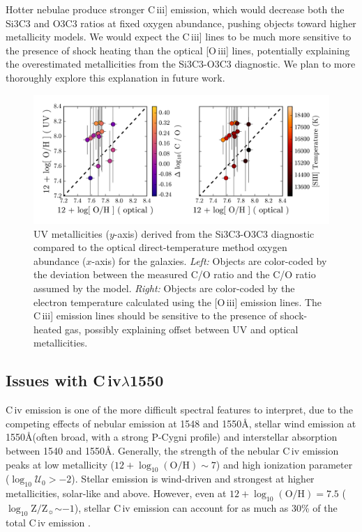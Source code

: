 \documentclass[preprint2]{aastex62}
\newcommand{\oiii}{[O\,{\sc iii}]\xspace}
\newcommand{\civ}{C\,{\sc iv}\xspace}
\newcommand{\ciii}{C\,{\sc iii}]\xspace}
\newcommand{\logten}{\ensuremath{\log_{10}}}
\newcommand{\logZ}{\ensuremath{\logten \mathrm{Z}/\mathrm{Z}_{\sun}}\xspace}
\newcommand{\logOH}{\ensuremath{\logten (\mathrm{O}/\mathrm{H})}\xspace}
\newcommand{\ang}{\ensuremath{\mbox{\AA}}\xspace}
\newcommand{\logU}{\ensuremath{\logten \mathcal{U}_0}}
\begin{document}
Hotter nebulae produce stronger \ciii emission, which would decrease both the Si3C3 and O3C3 ratios at fixed oxygen abundance, pushing objects toward higher metallicity models. We would expect the \ciii lines to be much more sensitive to the presence of shock heating than the optical \oiii lines, potentially explaining the overestimated metallicities from the Si3C3-O3C3 diagnostic. We plan to more thoroughly explore this explanation in future work.

\begin{figure}
  \begin{center}
    \includegraphics[width=\linewidth]{figs/f9.png}
    \caption{UV metallicities ($y$-axis) derived from the Si3C3-O3C3 diagnostic compared to the optical direct-temperature method oxygen abundance ($x$-axis) for the \citet{Berg+2016} galaxies. \emph{Left:} Objects are color-coded by the deviation between the measured C/O ratio and the C/O ratio assumed by the \citet{Byler+2018} model. \emph{Right:} Objects are color-coded by the electron temperature calculated using the \oiii emission lines. The \ciii emission lines should be sensitive to the presence of shock-heated gas, possibly explaining offset between UV and optical metallicities.}
    \label{fig:CO}
  \end{center}
\end{figure}
\subsection{Issues with \civ$\lambda$1550}

\civ emission is one of the more difficult spectral features to interpret, due to the competing effects of nebular emission at 1548 and 1550\ang, stellar wind emission at 1550\ang (often broad, with a strong P-Cygni profile) and interstellar absorption between 1540 and 1550\ang. Generally, the strength of the nebular \civ emission peaks at low metallicity ($12+\logOH \sim 7$) and high ionization parameter (\logU$>-2$). Stellar emission is wind-driven and strongest at higher metallicities, solar-like and above. However, even at $12+\logOH = 7.5$ (\logZ$\sim-1$), stellar \civ emission can account for as much as 30\% of the total \civ emission \citep{Byler+2018}.
\end{document}

